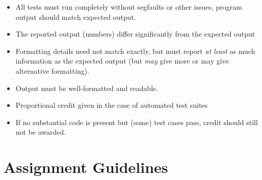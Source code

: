 \documentclass[12pt]{scrartcl}
\begin{document}
\begin{itemize}
  \item All tests must run completely without segfaults or other issues, program
  output should match expected output.
  \item The reported output (numbers) differ significantly from the expected output
  \item Formatting details need not match exactly, but must report \emph{at least} as much information as the expected output (but \emph{may} give more or may give alternative formatting).
  \item Output must be well-formatted and readable.
  \item Proportional credit given in the case of automated test suites
  \item If no substantial code is present but (some) test cases pass, credit should still not be awarded.
\end{itemize}

\newpage

\section*{Assignment Guidelines}
\end{document}

